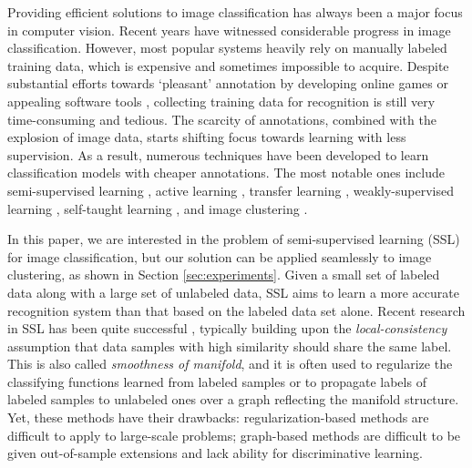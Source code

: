 Providing efficient solutions to image classification has always been a
major focus in computer vision. Recent years have witnessed
considerable progress in image classification. However, most popular
systems \citep{lazebnik:cvpr06, SVM-KNN, Bosch:iccv07, Boiman_CVPR_2008, Indoor, siftllc:cvpr10, 
Sun_2010, Yang_2014_CVPR} heavily rely
on manually labeled training data, which is expensive and sometimes
impossible to acquire. Despite substantial efforts towards
`pleasant' annotation by developing online games \citep{game:purpose}
or appealing software tools \citep{labelme}, collecting training data
for recognition is still very time-consuming and tedious. The scarcity
of annotations, combined with the explosion of image data, starts
shifting focus towards learning with less supervision. As a result,
numerous techniques have been developed to learn classification models
with cheaper annotations. The most notable ones include
semi-supervised learning \citep{Fergus09, Guillaumin:cvpr:10, dai:iccv13b}, 
active learning \citep{JainK:cvpr09, cvpr09:multi:al},
transfer learning \citep{Transfer:CVPR:08, tl:survey},
weakly-supervised learning \citep{cvpr12:weak:video, metric:imitation}, self-taught learning
\citep{self-taught:icml07}, and image clustering
\citep{Sivic05b, dai}.

In this paper, we are interested in the problem of semi-supervised
learning (SSL) for image classification, but our solution can be
applied seamlessly to image clustering, as shown in Section
\ref{sec:experiments}. Given a small set of labeled data along with a
large set of unlabeled data, SSL aims to learn a more accurate
recognition system than that based on the labeled data set alone.  
Recent research in SSL has been quite successful
\citep{Fergus09, SemiForest, SemiBoost, Zhu:ISL:2009, book06:ssl,
  eccv10:ssl, ecml14:ssl, nips14:ssl}, typically building upon the
\emph{local-consistency} assumption that data samples with high
similarity should share the same label. This is also called
\emph{smoothness of manifold}, and it is often used to regularize the
classifying functions learned from labeled samples or to propagate
labels of labeled samples to unlabeled ones over a graph reflecting
the manifold structure. Yet, these methods have their drawbacks:
regular\-ization-based methods \citep{Joachims:1999, neverhurt:icml11}
are difficult to apply to large-scale problems; graph-based methods
\citep{Zhu:Harmonic:03, Zhou:nips:04, Fergus09,icml10:large:graph:ssl}
are difficult to be given out-of-sample extensions and lack ability
for discriminative learning.

